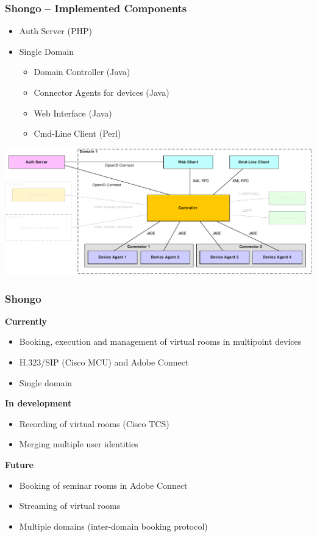 \documentclass{beamer}
\begin{document}
\begin{frame}
  \frametitle{Shongo -- Implemented Components}
  \begin{itemize}
    \item Auth Server (PHP)
    \item Single Domain
    \begin{itemize}
      \item Domain Controller (Java)
      \item Connector Agents for devices (Java)
      \item Web Interface (Java)
      \item Cmd-Line Client (Perl)
    \end{itemize}
  \end{itemize}
  \includegraphics[width=\textwidth]{../architecture/diagrams/dd_architecture_implemented.pdf}
\end{frame}

\begin{frame}
  \frametitle{Shongo}
  \textbf{Currently}
  \begin{itemize}
    \item Booking, execution and management of virtual rooms in multipoint devices
    \item H.323/SIP (Cisco MCU) and Adobe Connect
    \item Single domain
  \end{itemize}
  \textbf{In development}
  \begin{itemize}
    \item Recording of virtual rooms (Cisco TCS)
    \item Merging multiple user identities
  \end{itemize}
  \textbf{Future}
  \begin{itemize}
    \item Booking of seminar rooms in Adobe Connect
    \item Streaming of virtual rooms
    \item Multiple domains (inter-domain booking protocol)
  \end{itemize}
\end{frame}
\end{document}
